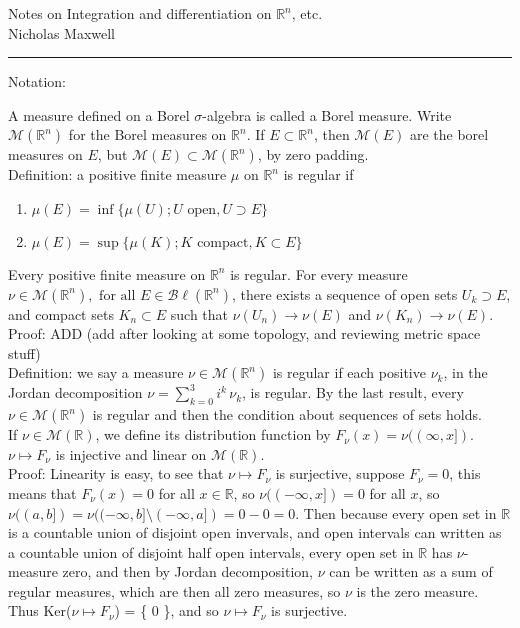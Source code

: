 \documentclass[12pt]{article}
\newcommand{\fall}[0] { \textrm{ for all } }
\newcommand{\reals}[0] { \mathbb{R}}
\newcommand{\M}[0] { \mathcal{M} }
\newcommand{\Bl}[0] { \mathcal{B} \ell }
\newcommand{\rarw}[0] { \rightarrow }
\begin{document}
\begin{flushleft}
Notes on Integration and differentiation on $\reals^n$, etc. \\
Nicholas Maxwell\\
\end{flushleft}

\begin{flushleft}
\addvspace{5pt} \hrule
\end{flushleft}	

Notation:




A measure defined on a Borel $\sigma$-algebra is called a Borel measure. Write $\M(\reals^n)$ for the Borel measures on $\reals^n$. If $E \subset \reals^n$, then $\M(E)$ are the borel measures on $E$, but $\M(E) \subset \M(\reals^n)$, by zero padding. \\

Definition: a positive finite measure $\mu$ on $\reals^n$ is regular if

\begin{enumerate}
\item
$\mu(E) = \inf \{ \mu(U) ; U \textrm{ open}, U \supset E \}$
\item
$\mu(E) = \sup \{ \mu(K) ; K \textrm{ compact}, K \subset E \}$
\end{enumerate}

Every positive finite measure on $\reals^n$ is regular. For every measure $\nu \in \M(\reals^n), \fall E \in \Bl(\reals^n)$, there exists a sequence of open sets $U_k \supset E$, and compact sets $K_n \subset E$ such that $\nu(U_n) \rarw \nu(E)$ and $\nu(K_n) \rarw \nu(E)$. \\

\noindent
Proof: ADD (add after looking at some topology, and reviewing metric space stuff)  \\

Definition: we say a measure $\nu \in \M(\reals^n)$ is regular if each positive $\nu_k$, in the Jordan decomposition $\nu = \sum_{k=0}^3 i^k \, \nu_k$, is regular. By the last result, every $\nu \in \M(\reals^n)$ is regular and then the condition about sequences of sets holds. \\

If $\nu \in \M(\reals)$, we define its distribution function by $F_\nu (x) = \nu((\infty,x])$. $\nu \mapsto F_\nu$ is injective and linear on $\M(\reals)$. \\

\noindent
Proof: Linearity is easy, to see that $\nu \mapsto F_\nu$ is surjective, suppose $F_\nu = 0$, this means that $F_\nu(x) = 0$ for all $x \in \reals$, so $\nu((-\infty, x]) = 0$ for all $x$, so $\nu((a,b]) = \nu((-\infty,b] \setminus (-\infty,a]) = 0 - 0 = 0$. Then because every open set in $\reals$ is a countable union of disjoint open invervals, and open intervals can written as a countable union of disjoint half open intervals, every open set in $\reals$ has $\nu$-measure zero, and then by Jordan decomposition, $\nu$ can be written as a sum of regular measures, which are then all zero measures, so $\nu$ is the zero measure. Thus Ker($\nu \mapsto F_\nu$) = \{ 0 \}, and so $\nu \mapsto F_\nu$ is surjective. \\
\end{document}
